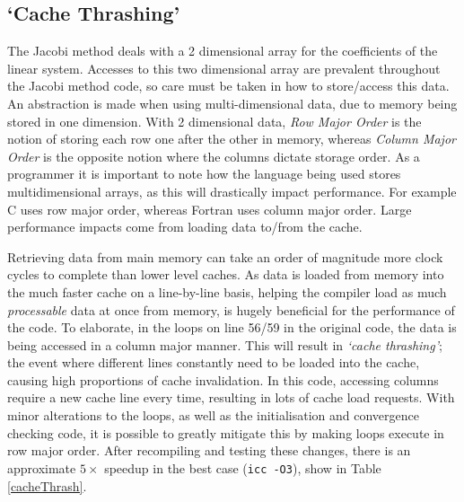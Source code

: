 \documentclass[10pt,twocolumn,a4paper]{article}
\begin{document}
\subsection{`Cache Thrashing'}
The Jacobi method deals with a 2 dimensional array for the coefficients of the linear system. Accesses to this two dimensional array are prevalent throughout the Jacobi method code, so care must be taken in how to store/access this data. An abstraction is made when using multi-dimensional data, due to memory being stored in one dimension. With 2 dimensional data, \textit{Row Major Order} is the notion of storing each row one after the other in memory, whereas \textit{Column Major Order} is the opposite notion where the columns dictate storage order. As a programmer it is important to note how the language being used stores multidimensional arrays, as this will drastically impact performance. For example C uses row major order, whereas Fortran uses column major order. Large performance impacts come from loading data to/from the cache. \par

Retrieving data from main memory can take an order of magnitude more clock cycles to complete than lower level caches. As data is loaded from memory into the much faster cache on a line-by-line basis, helping the compiler load as much \textit{processable} data at once from memory, is hugely beneficial for the performance of the code. To elaborate, in the loops on line 56/59 in the original code\cite{hpc-cw1-code}, the data is being accessed in a column major manner. This will result in \textit{`cache thrashing'}; the event where different lines constantly need to be loaded into the cache, causing high proportions of cache invalidation. In this code, accessing columns require a new cache line every time, resulting in lots of cache load requests. With minor alterations to the loops, as well as the initialisation and convergence checking code, it is possible to greatly mitigate this by making loops execute in row major order. After recompiling and testing these changes, there is an approximate $5\times$ speedup in the best case (\texttt{icc -O3}), show in Table \ref{cacheThrash}.
\end{document}
